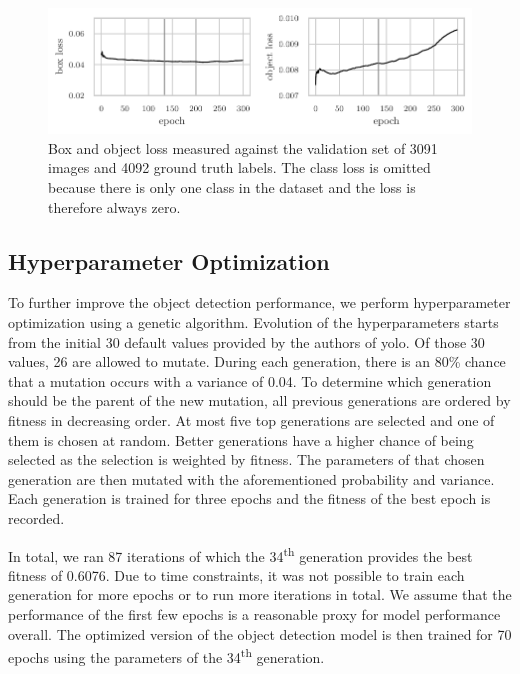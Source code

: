 \documentclass[draft,final]{vutinfth} %
\begin{document}
\begin{figure}
  \centering
  \includegraphics{graphics/val_box_obj_loss.pdf}
  \caption[Object detection box and object loss.]{Box and object loss
    measured against the validation set of \num{3091} images and
    \num{4092} ground truth labels. The class loss is omitted because
    there is only one class in the dataset and the loss is therefore
    always zero.}
  \label{fig:box-obj-loss}
\end{figure}

\subsection{Hyperparameter Optimization}
\label{ssec:obj-hypopt}

To further improve the object detection performance, we perform
hyperparameter optimization using a genetic algorithm. Evolution of
the hyperparameters starts from the initial \num{30} default values
provided by the authors of \gls{yolo}. Of those \num{30} values,
\num{26} are allowed to mutate. During each generation, there is an
80\% chance that a mutation occurs with a variance of \num{0.04}. To
determine which generation should be the parent of the new mutation,
all previous generations are ordered by fitness in decreasing
order. At most five top generations are selected and one of them is
chosen at random. Better generations have a higher chance of being
selected as the selection is weighted by fitness. The parameters of
that chosen generation are then mutated with the aforementioned
probability and variance. Each generation is trained for three epochs
and the fitness of the best epoch is recorded.

In total, we ran \num{87} iterations of which the
\num{34}\textsuperscript{th} generation provides the best fitness of
\num{0.6076}. Due to time constraints, it was not possible to train
each generation for more epochs or to run more iterations in total. We
assume that the performance of the first few epochs is a reasonable
proxy for model performance overall. The optimized version of the
object detection model is then trained for \num{70} epochs using the
parameters of the \num{34}\textsuperscript{th} generation.
\end{document}
